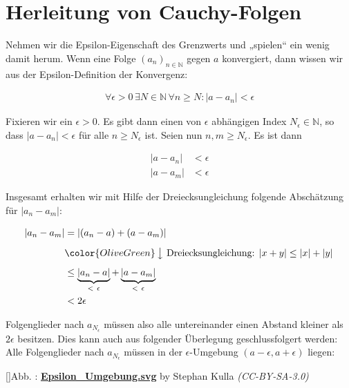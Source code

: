 \documentclass[fontsize=9pt,
               parskip=half-,
               DIV=14,
               listof=chapterentry,
               tocflat]{scrbook}
\newcounter{imagelabel}
\begin{document}
\section{Herleitung von Cauchy-Folgen}

Nehmen wir die Epsilon-Eigenschaft des Grenzwerts und „spielen“ ein wenig damit herum. Wenn eine Folge $(a_{n})_{n\in \mathbb {N} }$ gegen $a$ konvergiert, dann wissen wir aus der Epsilon-Definition der Konvergenz:

\begin{align*}
\forall \epsilon >0\,\exists N\in \mathbb {N} \,\forall n\geq N:|a-a_{n}|<\epsilon 
\end{align*}

Fixieren wir ein $\epsilon >0$. Es gibt dann einen von $\epsilon $ abhängigen Index $N_{\epsilon }\in \mathbb {N} $, so dass $|a-a_{n}|<\epsilon $ für alle $n\geq N_{\epsilon }$ ist. Seien nun $n,m\geq N_{\epsilon }$. Es ist dann

\begin{align*}
|a-a_{n}|&<\epsilon \\|a-a_{m}|&<\epsilon 
\end{align*}

Insgesamt erhalten wir mit Hilfe der Dreiecksungleichung folgende Abschätzung für $|a_{n}-a_{m}|$:

\begin{align*}
|a_{n}-a_{m}|&=|(a_{n}-a)+(a-a_{m})|\\[0.5em]&{\color {OliveGreen}\left\downarrow \ {\text{Dreiecksungleichung: }}|x+y|\leq |x|+|y|\right.}\\[0.5em]&\leq \underbrace {|a_{n}-a|} _{<\ \epsilon }+\underbrace {|a-a_{m}|} _{<\ \epsilon }\\&<2\epsilon 
\end{align*}

Folgenglieder nach $a_{N_{\epsilon }}$ müssen also alle untereinander einen Abstand kleiner als $2\epsilon $ besitzen. Dies kann auch aus folgender Überlegung geschlussfolgert werden: Alle Folgenglieder nach $a_{N_{\epsilon }}$ müssen in der $\epsilon $-Umgebung $(a-\epsilon ,a+\epsilon )$ liegen:

[]{Abb. : \protect\href{https://commons.wikimedia.org/wiki/File:Epsilon_Umgebung.svg}{\textbf{Epsilon\allowbreak\_Umgebung.svg}} by Stephan Kulla \textit{(CC-BY-SA-3.0)}}\begin{center}
\end{center}
\end{document}
